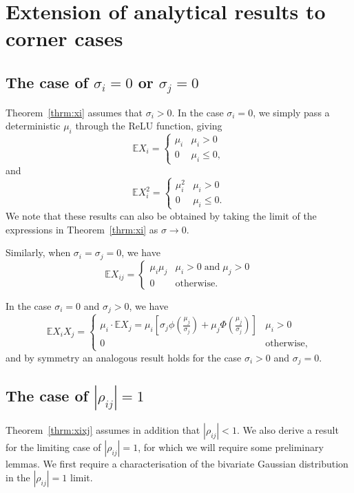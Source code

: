 \documentclass{article}
\newcommand{\EE}{\mathbb{E}}
\newcommand{\ra}{\rightarrow}
\begin{document}
\section{Extension of analytical results to corner cases}\label{rho1_proof}

\subsection{The case of $\sigma_i=0$ or $\sigma_j=0$}

Theorem~\ref{thrm:xi} assumes that $\sigma_i>0$. In the case $\sigma_i=0$, we simply pass a deterministic $\mu_i$ through the ReLU function, giving 
$$\EE X_i=\left\{\begin{array}{ll}\mu_i&\mu_i>0\\
0&\mu_i\le 0,\end{array}\right.$$
and
$$\EE X_i^2=\left\{\begin{array}{ll}\mu_i^2&\mu_i>0\\
0&\mu_i\le 0.\end{array}\right.$$
We note that these results can also be obtained by taking the limit of the expressions in Theorem~\ref{thrm:xi} as $\sigma\ra 0$.

Similarly, when $\sigma_i=\sigma_j=0$, we have
$$\EE X_{ij}=\left\{\begin{array}{ll}\mu_i\mu_j&\mu_i>0\;\textrm{and}\;\mu_j>0\\
0&\textrm{otherwise}.\end{array}\right.$$

In the case $\sigma_i=0$ and $\sigma_j>0$, we have
$$\EE X_i X_j=\left\{\begin{array}{ll}\mu_i\cdot\EE X_j=\mu_i\left[\sigma_j \phi \left( \frac{\mu_j}{\sigma_j} \right)+\mu_j \Phi \left( \frac{\mu_j}{\sigma_j} \right)\right]&\mu_i>0\\0&\textrm{otherwise},\end{array}\right. $$
and by symmetry an analogous result holds for the case $\sigma_i>0$ and $\sigma_j=0$.

\subsection{The case of $|\rho_{ij}|=1$}

Theorem~\ref{thrm:xixj} assumes in addition that $|\rho_{ij}|<1$. We also derive a result for the limiting case of $|\rho_{ij}|=1$, for which we will require some preliminary lemmas. We first require a characterisation of the bivariate Gaussian distribution in the $|\rho_{ij}|=1$ limit.
\end{document}

